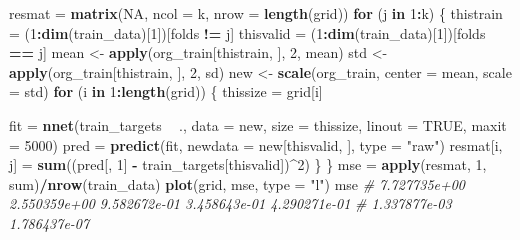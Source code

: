\documentclass[10pt,ignorenonframetext,]{beamer}
\newenvironment{Shaded}{\begin{snugshade}}{\end{snugshade}}
\newcommand{\KeywordTok}[1]{\textcolor[rgb]{0.13,0.29,0.53}{\textbf{#1}}}
\newcommand{\DataTypeTok}[1]{\textcolor[rgb]{0.13,0.29,0.53}{#1}}
\newcommand{\DecValTok}[1]{\textcolor[rgb]{0.00,0.00,0.81}{#1}}
\newcommand{\StringTok}[1]{\textcolor[rgb]{0.31,0.60,0.02}{#1}}
\newcommand{\CommentTok}[1]{\textcolor[rgb]{0.56,0.35,0.01}{\textit{#1}}}
\newcommand{\OtherTok}[1]{\textcolor[rgb]{0.56,0.35,0.01}{#1}}
\newcommand{\ControlFlowTok}[1]{\textcolor[rgb]{0.13,0.29,0.53}{\textbf{#1}}}
\newcommand{\OperatorTok}[1]{\textcolor[rgb]{0.81,0.36,0.00}{\textbf{#1}}}
\newcommand{\NormalTok}[1]{#1}
\begin{document}
\begin{frame}[fragile]
\begin{Shaded}
\begin{Highlighting}[]
\NormalTok{resmat =}\StringTok{ }\KeywordTok{matrix}\NormalTok{(}\OtherTok{NA}\NormalTok{, }\DataTypeTok{ncol =}\NormalTok{ k, }\DataTypeTok{nrow =} \KeywordTok{length}\NormalTok{(grid))}
\ControlFlowTok{for}\NormalTok{ (j }\ControlFlowTok{in} \DecValTok{1}\OperatorTok{:}\NormalTok{k) \{}
\NormalTok{    thistrain =}\StringTok{ }\NormalTok{(}\DecValTok{1}\OperatorTok{:}\KeywordTok{dim}\NormalTok{(train_data)[}\DecValTok{1}\NormalTok{])[folds }\OperatorTok{!=}\StringTok{ }\NormalTok{j]}
\NormalTok{    thisvalid =}\StringTok{ }\NormalTok{(}\DecValTok{1}\OperatorTok{:}\KeywordTok{dim}\NormalTok{(train_data)[}\DecValTok{1}\NormalTok{])[folds }\OperatorTok{==}\StringTok{ }\NormalTok{j]}
\NormalTok{    mean <-}\StringTok{ }\KeywordTok{apply}\NormalTok{(org_train[thistrain, ], }\DecValTok{2}\NormalTok{, mean)}
\NormalTok{    std <-}\StringTok{ }\KeywordTok{apply}\NormalTok{(org_train[thistrain, ], }\DecValTok{2}\NormalTok{, sd)}
\NormalTok{    new <-}\StringTok{ }\KeywordTok{scale}\NormalTok{(org_train, }\DataTypeTok{center =}\NormalTok{ mean, }\DataTypeTok{scale =}\NormalTok{ std)}
    \ControlFlowTok{for}\NormalTok{ (i }\ControlFlowTok{in} \DecValTok{1}\OperatorTok{:}\KeywordTok{length}\NormalTok{(grid)) \{}
\NormalTok{        thissize =}\StringTok{ }\NormalTok{grid[i]}
        
\NormalTok{        fit =}\StringTok{ }\KeywordTok{nnet}\NormalTok{(train_targets }\OperatorTok{~}\StringTok{ }\NormalTok{., }\DataTypeTok{data =}\NormalTok{ new, }\DataTypeTok{size =}\NormalTok{ thissize, }
            \DataTypeTok{linout =} \OtherTok{TRUE}\NormalTok{, }\DataTypeTok{maxit =} \DecValTok{5000}\NormalTok{)}
\NormalTok{        pred =}\StringTok{ }\KeywordTok{predict}\NormalTok{(fit, }\DataTypeTok{newdata =}\NormalTok{ new[thisvalid, ], }\DataTypeTok{type =} \StringTok{"raw"}\NormalTok{)}
\NormalTok{        resmat[i, j] =}\StringTok{ }\KeywordTok{sum}\NormalTok{((pred[, }\DecValTok{1}\NormalTok{] }\OperatorTok{-}\StringTok{ }\NormalTok{train_targets[thisvalid])}\OperatorTok{^}\DecValTok{2}\NormalTok{)}
\NormalTok{    \}}
\NormalTok{\}}
\NormalTok{mse =}\StringTok{ }\KeywordTok{apply}\NormalTok{(resmat, }\DecValTok{1}\NormalTok{, sum)}\OperatorTok{/}\KeywordTok{nrow}\NormalTok{(train_data)}
\KeywordTok{plot}\NormalTok{(grid, mse, }\DataTypeTok{type =} \StringTok{"l"}\NormalTok{)}
\NormalTok{mse}
\CommentTok{# 7.727735e+00 2.550359e+00 9.582672e-01 3.458643e-01 4.290271e-01}
\CommentTok{# 1.337877e-03 1.786437e-07}
\end{Highlighting}
\end{Shaded}

\end{frame}
\end{document}
